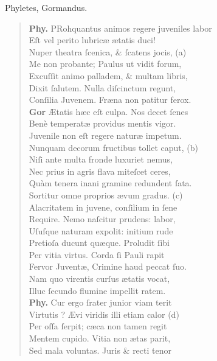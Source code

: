 \documentclass[a4paper,12pt]{article}
\begin{document}
Phyletes, Gormandus.
\begin{verse}
\textbf{Phy.} PRohquantus animos regere juveniles labor\\[0pt]
Eſt vel perito lubricæ ætatis duci!\\[0pt]
Nuper theatra ſcenica, \& ſcatens jocis, (a)\footnotemark\\[0pt]
Me non probante; Paulus ut vidit forum,\\[0pt]
Excuſſit animo palladem, \& multam libris,\\[0pt]
Dixit ſalutem. Nulla diſcinctum regunt,\\[0pt]
Conſilia Juvenem. Fræna non patitur ferox.\\[0pt]
\textbf{Gor} Ætatis hæc eſt culpa. Nos decet ſenes\\[0pt]
Benè temperatæ providus mentis vigor.\\[0pt]
Juvenile non eſt regere naturæ impetum.\\[0pt]
Nunquam decorum fructibus tollet caput, (b)\footnotemark\\[0pt]
Niſi ante multa fronde luxuriet nemus,\\[0pt]
Nec prius in agris flava miteſcet ceres,\\[0pt]
Quàm tenera inani gramine redundent ſata.\\[0pt]
Sortitur omne proprios ævum gradus. (c)\footnotemark\\[0pt]
Alacritatem in juvene, conſilium in ſene\\[0pt]
Require. Nemo naſcitur prudens: labor,\\[0pt]
Uſuſque naturam expolit: initium rude\\[0pt]
Pretioſa ducunt quæque. Proludit ſibi\\[0pt]
Per vitia virtus. Corda ſi Pauli rapit\\[0pt]
Fervor Juventæ, Crimine haud peccat ſuo.\\[0pt]
Nam quo virentis curſus ætatis vocat,\\[0pt]
Illuc ſecundo flumine impellit ratem.\\[0pt]
\textbf{Phy.} Cur ergo ſrater junior viam terit\\[0pt]
Virtutis ? Ævi viridis illi etiam calor (d)\footnotemark\\[0pt]
Per oſſa ſerpit; cæca non tamen regit\\[0pt]
Mentem cupido. Vitia non ætas parit,\\[0pt]
Sed mala voluntas. Juris \& recti tenor\\[0pt]

\end{verse}
\end{document}

